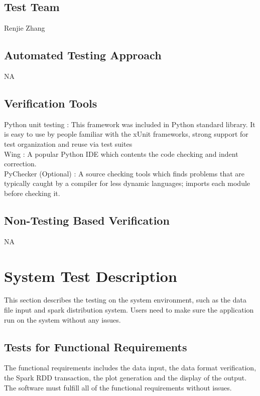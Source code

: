 \documentclass[12pt, titlepage]{article}
\begin{document}
\subsection{Test Team}

Renjie Zhang

\subsection{Automated Testing Approach}
NA
\subsection{Verification Tools}
Python unit testing : This framework was included in Python standard library. It is easy to use by people familiar with the xUnit frameworks, strong support for test organization and reuse via test suites\\
Wing : A popular Python IDE which contents the code checking and indent correction.\\
PyChecker (Optional) : A source checking tools which finds problems that are typically caught by a compiler for less dynamic languages; imports each module before checking it.\\




\subsection{Non-Testing Based Verification}
NA

\section{System Test Description}
This section describes the testing on the system environment, such as the data file input and spark distribution system. Users need to make sure the application run on the system without any issues. 
\subsection{Tests for Functional Requirements}
The functional requirements includes the data input, the data format verification, the Spark RDD transaction, the plot generation and the display of the output. The software must fulfill all of the functional requirements without issues.
\end{document}
